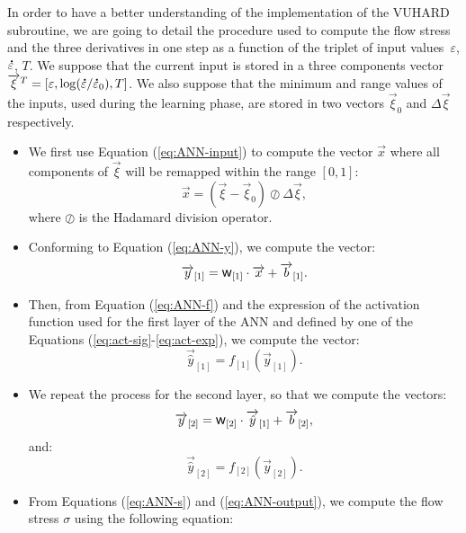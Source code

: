 \documentclass[algorithms,article,submit,pdftex,oneauthors]{Definitions/mdpi}
\DeclareRobustCommand{\w}{\mbox{\large\ensuremath{\mathsf{w}}}}
\DeclareRobustCommand{\lay}[1]{_{[#1]}}
\DeclareRobustCommand{\mdot}[1]{\accentset{\mbox{\bfseries .}}{#1}}
\begin{document}
In order to have a better understanding of the implementation of the VUHARD subroutine, we are going to detail the procedure used to compute the flow stress and the three derivatives in one step as a function of the triplet of input values~$\varepsilon$, $\mdot{\varepsilon}$, $T$.
We suppose that the current input is stored in a three components vector $\overrightarrow{\xi}^T=\left[\varepsilon, \log(\mdot{\varepsilon}/\mdot{\varepsilon}_{0}), T\right]$.
We also suppose that the minimum and range values of the inputs, used during the learning phase, are stored in two vectors $\overrightarrow{\xi}_{0}$ and $\Delta\overrightarrow{\xi}$ respectively.
\begin{itemize}
\item We first use Equation (\ref{eq:ANN-input}) to compute the vector $\overrightarrow{x}$ where all components of $\overrightarrow{\xi}$ will be remapped within the range $[0,1]$:
\begin{equation}
\overrightarrow{x}=\left(\overrightarrow{\xi}-\overrightarrow{\xi}_{0}\right)\oslash\Delta\overrightarrow{\xi},
\end{equation}
where $\oslash$ is the Hadamard division operator.
\item Conforming to Equation (\ref{eq:ANN-y}), we compute the vector:
\begin{equation}
\overrightarrow{y}\lay{1}=\w\lay{1}\cdot\overrightarrow{x}+\overrightarrow{b}\lay{1}.
\end{equation}
\item Then, from Equation (\ref{eq:ANN-f}) and the expression of the activation function used for the first layer of the ANN and defined by one of the Equations (\ref{eq:act-sig}-\ref{eq:act-exp}), we compute the vector:
\begin{equation}
\overrightarrow{\hat{y}}\lay{1}=f\lay{1}(\overrightarrow{y}\lay{1}).
\end{equation}
\item We repeat the process for the second layer, so that we compute the vectors: \begin{equation}
\overrightarrow{y}\lay{2}=\w\lay{2}\cdot\overrightarrow{\hat{y}}\lay{1}+\overrightarrow{b}\lay{2},
\end{equation}
and:
\begin{equation}
\overrightarrow{\hat{y}}\lay{2}=f\lay{2}(\overrightarrow{y}\lay{2}).
\end{equation}
\item From Equations (\ref{eq:ANN-s}) and (\ref{eq:ANN-output}), we compute the flow stress $\sigma$ using the following equation:

\end{itemize}
\end{document}
